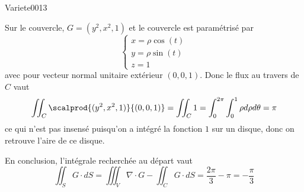 \begin{corrige}{Variete0013}
\begin{enumerate}
  Sur le couvercle, $G = (y^2, x^2, 1)$ et le couvercle est paramétrisé par
  \begin{equation*}
    \begin{cases}
      x = \rho \cos(t)\\
      y = \rho \sin(t)\\
      z = 1
    \end{cases}
  \end{equation*}
  avec pour vecteur normal unitaire extérieur $(0,0,1)$. Donc le flux au travers
  de $C$ vaut
  \begin{equation*}
    \iint_C \scalprod{(y^2,x^2,1)}{(0,0,1)} =  \iint_C 1 =
    \int_0^{2\pi} \int_0^1 \rho d\rho d \theta = \pi
  \end{equation*}
  ce qui n'est pas insensé puisqu'on a intégré la fonction $1$ sur un
  disque, donc on retrouve l'aire de ce disque.

  En conclusion, l'intégrale recherchée au départ vaut
  \begin{equation*}
    \iint_S G \cdot d S  = \iiint_V \nabla\cdot G - \iint_C G \cdot d S =
    \frac{2\pi}3 - \pi = -\frac\pi3
  \end{equation*}
\end{enumerate}


\end{corrige}
